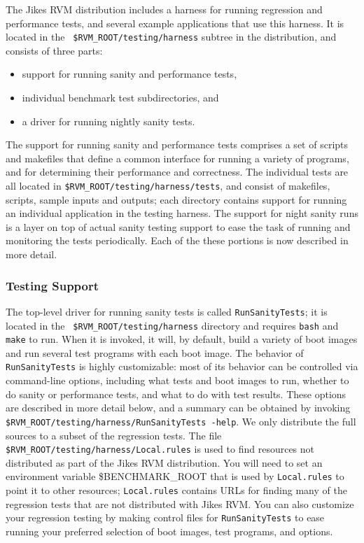  The Jikes\TMweb{} RVM distribution includes a harness for running
regression and performance tests, and several example applications
that use this harness.  It is located in the {\tt
\$RVM\_\-ROOT/testing/harness} subtree in the distribution, and consists
of three parts:
\begin{itemize}
\item support for running sanity and performance tests, 
\item individual benchmark test subdirectories, and 
\item a driver for running nightly sanity tests.  
\end{itemize}
The support for running
sanity and performance tests comprises a set of scripts and makefiles
that define a common interface for running a variety of programs, and
for determining their performance and correctness.  The individual
tests are all located in {\tt{\$RVM\_\-ROOT/testing/harness/tests}}, and
consist of makefiles, scripts, sample inputs and outputs; each
directory contains support for running an individual application in
the testing harness.  The support for night sanity runs is a layer on
top of actual sanity testing support to ease the task of running and
monitoring the tests periodically.  Each of the these portions is now
described in more detail.

\subsubsection{Testing Support}

The top-level driver for running sanity tests is called
{\tt{RunSanityTests}}; it is located in the {\tt
\$RVM\_\-ROOT/testing/harness} directory 
and requires {\tt{bash}} and {{\tt make}} to run.  When it
is invoked, it will, by default, build a variety of boot images and
run several test programs with each boot image.  The behavior of
\texttt{RunSanityTests} is highly customizable: most of its behavior can be
controlled via command-line options, including what tests and boot
images to run, whether to do sanity or performance tests, and what to
do with test results. These options are described in more detail
below, and a summary can be obtained by invoking {\tt
\$RVM\_\-ROOT/testing/harness/RunSanityTests -help}. 
We only distribute the full sources to a subset of the regression
tests. The file {\tt \$RVM\_\-ROOT/testing/harness/Local.rules} is used
to find resources not distributed as part of the Jikes RVM
distribution.  You will need to set an environment variable 
\$BENCHMARK\_\-ROOT that is used by {\tt Local.rules} to point it to
other resources; {\tt Local.rules} contains URLs for finding many of
the regression tests that are not distributed with Jikes RVM.\@
You can also customize your regression testing by making control files
for \texttt{RunSanityTests} to ease running your preferred selection of boot
images, test programs, and options. 

